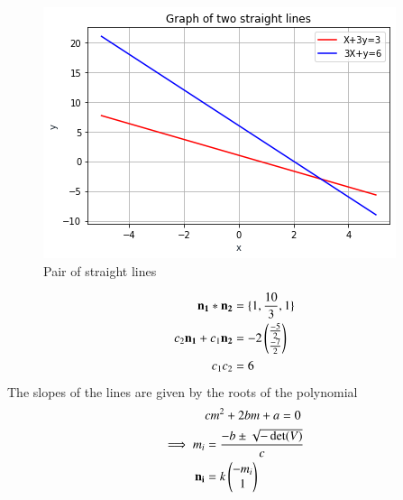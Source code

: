 \begin{figure}[h]
    \centering
    \includegraphics[width=\columnwidth]{./solutions/13/11/assignment5.png}
    \caption{Pair of straight lines}
    \label{Fig:solutions/13/11/1}
\end{figure}
\begin{align}
    \mathbf{n_1}*\mathbf{n_2}&=\{1,\frac{10}{3},1\}\label{eq:solutions/13/11/conv}\\
    c_2\mathbf{n_1}+c_1\mathbf{n_2}&=-2\begin{pmatrix}\frac{-5}{2}\\\frac{-7}{2}\end{pmatrix}\label{eq:solutions/13/11/eq98}\\
    c_1c_2&=6
\end{align}
The slopes of the lines are given by the roots of the polynomial 
\begin{align}
    &cm^2+2bm+a=0\label{eq:solutions/13/11/e}\\
    \implies m_i&=\frac{-b\pm{\sqrt{-\det(V)}}}{c}\\
    \mathbf{n_i}&=k\begin{pmatrix}-m_i\\1\end{pmatrix}
\end{align}
